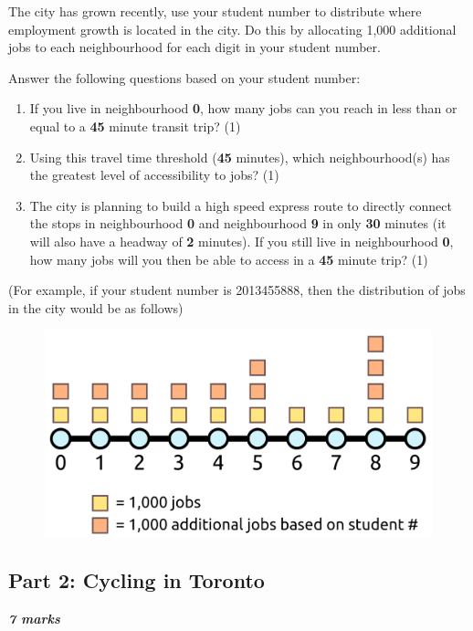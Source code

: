 \documentclass[11pt]{article}
\begin{document}
	The city has grown recently, use your student number to distribute where employment growth is located in the city. Do this by allocating 1,000 additional jobs to each neighbourhood for each digit in your student number.
	
	Answer the following questions based on your student number:
	
	\begin{enumerate}
		
		
		\item If you live in neighbourhood \textbf{0}, how many jobs can you reach in less than or equal to a \textbf{45} minute transit trip? (1) 
		
		\item Using this travel time threshold (\textbf{45} minutes), which neighbourhood(s) has the greatest level of accessibility to jobs? (1) 
		
		\item The city is planning to build a high speed express route to directly connect the stops in neighbourhood \textbf{0} and neighbourhood \textbf{9} in only \textbf{30} minutes (it will also have a headway of \textbf{2} minutes). If you still live in neighbourhood \textbf{0}, how many jobs will you then be able to access in a \textbf{45} minute trip? (1) 
		
	\end{enumerate}

	(For example, if your student number is 2013455888, then the distribution of jobs in the city would be as follows)
	
	\begin{figure}[h]
		\centering
		\includegraphics[width=0.5\linewidth]{images/city_jobs.png}
	\end{figure}
	
	
	
	
	
	
	\subsection*{Part 2: Cycling in Toronto}
	
	\vspace{-2mm}
	\textbf{\textit{7 marks}}
	
\end{document}
